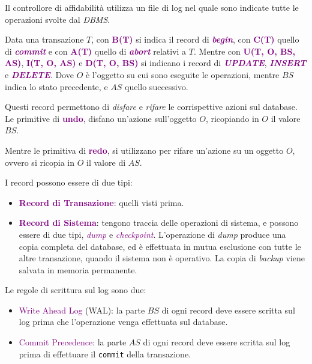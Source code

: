 Il controllore di affidabilità utilizza un file di log nel quale sono indicate tutte
le operazioni svolte dal \emph{DBMS}.

Data una transazione $T$, con \textbf{\textcolor{purple}{B(T)}} si indica
il record di \emph{\textbf{\textcolor{purple}{begin}}}, con \textbf{\textcolor{purple}{C(T)}}
quello di \emph{\textbf{\textcolor{purple}{commit}}} e con \textbf{\textcolor{purple}{A(T)}}
quello di \emph{\textbf{\textcolor{purple}{abort}}} relativi a $T$. Mentre con \textbf{\textcolor{purple}{U(T, O, BS, AS)}},
\textbf{\textcolor{purple}{I(T, O, AS)}} e \textbf{\textcolor{purple}{D(T, O, BS)}} si indicano i record
di \emph{\textbf{\textcolor{purple}{UPDATE}}}, \emph{\textbf{\textcolor{purple}{INSERT}}} e \emph{\textbf{\textcolor{purple}{DELETE}}}.
Dove $O$ è l'oggetto su cui sono eseguite le operazioni, mentre $BS$ indica lo stato precedente,
e $AS$ quello successivo.

Questi record permettono di \emph{disfare} e \emph{rifare} le corrispettive
azioni sul database. Le primitive di \textbf{\textcolor{purple}{undo}}, disfano
un'azione sull'oggetto $O$, ricopiando in $O$ il valore $BS$.

Mentre le primitiva di \textbf{\textcolor{purple}{redo}}, si utilizzano per
rifare un'azione su un oggetto $O$, ovvero si ricopia in $O$ il valore di $AS$.

I record possono essere di due tipi:
\begin{itemize}
    \item \textbf{\textcolor{purple}{Record di Transazione}}: quelli visti prima.
    \item \textbf{\textcolor{purple}{Record di Sistema}}: tengono traccia delle operazioni di sistema,
        e possono essere di due tipi, \emph{\textcolor{purple}{dump}} e \emph{\textcolor{purple}{checkpoint}}.
        L'operazione di \emph{dump} produce una copia completa del database, ed è effettuata
        in mutua esclusione con tutte le altre transazione, quando il sistema non è operativo.
        La copia di \emph{backup} viene salvata in memoria permanente.
\end{itemize}

Le regole di scrittura sul log sono due:
\begin{itemize}
    \item \textcolor{purple}{Write Ahead Log} (WAL): la parte $BS$ di ogni record
        deve essere scritta sul log prima che l'operazione venga effettuata sul database.
    \item \textcolor{purple}{Commit Precedence}: la parte $AS$ di ogni record deve essere
        scritta sul log prima di effettuare il \verb|commit| della transazione.
\end{itemize}

